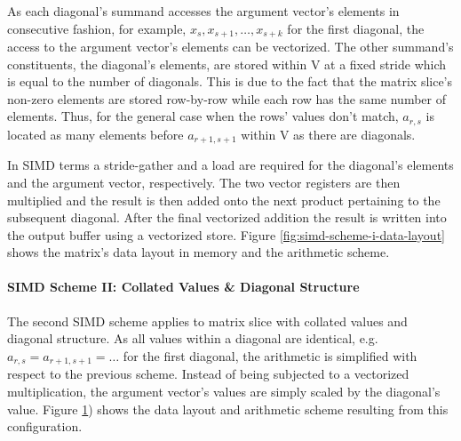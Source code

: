           As each diagonal's summand accesses the argument vector's elements in consecutive fashion, for example, $x_s,
          x_{s+1}, \ldots, x_{s + k}$ for the first diagonal, the access to the argument vector's elements can be
          vectorized. The other summand's constituents, the diagonal's elements, are stored within V at a fixed stride
          which is equal to the number of diagonals. This is due to the fact that the matrix slice's non-zero elements
          are stored row-by-row while each row has the same number of elements. Thus, for the general case when the
          rows' values don't match, $a_{r, s}$ is located as many elements before $a_{r+1, s+1}$ within V as there are
          diagonals.

          In SIMD terms a stride-gather and a load are required for the diagonal's elements and the argument vector,
          respectively. The two vector registers are then multiplied and the result is then added onto the next product
          pertaining to the subsequent diagonal. After the final vectorized addition the result is written into the
          output buffer using a vectorized store. Figure \ref{fig:simd-scheme-i-data-layout} shows the matrix's data
          layout in memory and the arithmetic scheme.

        \paragraph{SIMD Scheme II: Collated Values \& Diagonal Structure}

          The second SIMD scheme applies to matrix slice with collated values and diagonal structure. As all values
          within a diagonal are identical, e.g. $a_{r,s} = a_{r+1, s+1} = \ldots$ for the first diagonal, the arithmetic
          is simplified with respect to the previous scheme. Instead of being subjected to a vectorized multiplication,
          the argument vector's values are simply scaled by the diagonal's value. Figure \ref{fig:simd-scheme-ii-data-layout})
          shows the data layout and arithmetic scheme resulting from this configuration.

          \begin{figure}[ht]
            \centering
            \captionsetup{width=0.9\columnwidth}
            
            \label{fig:simd-scheme-ii-data-layout}
          \end{figure}

